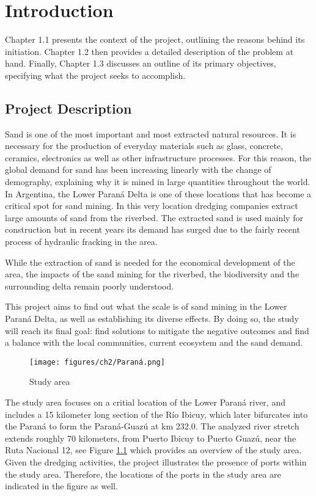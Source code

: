\chapter{Introduction}
\label{chapter:introduction}

Chapter 1.1 presents the context of the project, outlining the reasons behind its initiation. Chapter 1.2 then provides a detailed description of the problem at hand. Finally, Chapter 1.3 discusses an outline of its primary objectives, specifying what the project seeks to accomplish.

\section{Project Description}
Sand is one of the most important and most extracted natural resources. It is necessary for the production of everyday materials such as glass, concrete, ceramics, electronics as well as other infrastructure processes. For this reason, the global demand for sand has been increasing linearly with the change of demography, explaining why it is mined in large quantities throughout the world. In Argentina, the Lower Paraná Delta is one of these locations that has become a critical spot for sand mining. In this very location dredging companies extract large amounts of sand from the riverbed. The extracted sand is used mainly for construction but in recent years its demand has surged due to the fairly recent process of hydraulic fracking in the area.



While the extraction of sand is needed for the economical development of the area, the impacts of the sand mining for the riverbed, the biodiversity and the surrounding delta remain poorly understood. 

This project aims to find out what the scale is of sand mining in the Lower Paraná Delta, as well as establishing its diverse effects. By doing so, the study will reach its final goal: find solutions to mitigate the negative outcomes and find a balance with the local communities, current ecosystem and the sand demand. 



\begin{figure}[H]
    \centering    \texttt{[image: figures/ch2/Paraná.png]}
    \caption{Study area}
    \label{fig:study area}
\end{figure}
\label{Figure 1.1}

The study area focuses on a critial location of the Lower Paraná river, and includes a 15 kilometer long section of the Río Ibicuy, which later bifurcates into the Paraná to form the Paraná-Guazú at km 232.0. The analyzed river stretch extends roughly 70 kilometers, from Puerto Ibicuy to Puerto Guazú, near the Ruta Nacional 12, see Figure \ref{fig:study area} which provides an overview of the study area. Given the dredging activities, the project illustrates the presence of ports within the study area. Therefore, the locations of the ports in the study area are indicated in the figure as well. 

